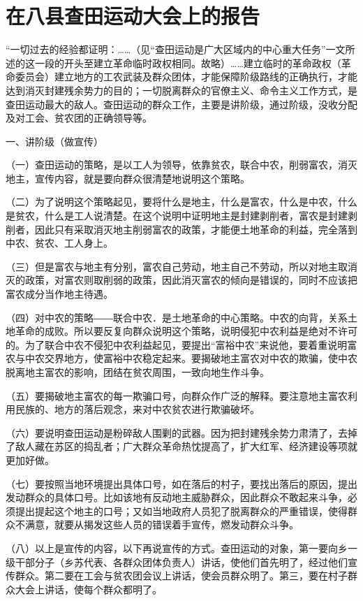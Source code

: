 \section[在八县查田运动大会上的报告（一九三三年六月十四日）]{在八县查田运动大会上的报告}


“一切过去的经验都证明：……（见“查田运动是广大区域内的中心重大任务”一文所述的这一段的开头至建立革命临时政权相同。故略）……建立临时的革命政权（革命委员会）建立地方的工农武装及群众团体，才能保障阶级路线的正确执行，才能达到消灭封建残余势力的目的；一切脱离群众的官僚主义、命令主义工作方式，是查田运动最大的敌人。查田运动的群众工作，主要是讲阶级，通过阶级，没收分配及对工会、贫农团的正确领导等。

一、讲阶级（做宣传）

（一）查田运动的策略，是以工人为领导，依靠贫农，联合中农，削弱富农，消灭地主，宣传内容，就是要向群众很清楚地说明这个策略。

（二）为了说明这个策略起见，要将什么是地主，什么是富农，什么是中农，什么是贫农，什么是工人说清楚。在这个说明中证明地主是封建剥削者，富农是封建剥削者，因此只有采取消灭地主削弱富农的政策，才能便土地革命的利益，完全落到中农、贫农、工人身上。

（三）但是富农与地主有分别，富农自己劳动，地主自己不劳动，所以对地主取消灭的政策，对富农则取削弱的政策，因此消灭富农的倾向是错误的，同时不应该把富农成分当作地主待遇。

（四）对中农的策略――联合中农．是土地革命的中心策略。中农的向背，关系土地革命的成败。所以要反复向群众说明这个策略，说明侵犯中农利益是绝对不许可的。为了联合中农不侵犯中农利益起见，要提出“富裕中农”来说他，要着重说明富农与中农交界地方，使富裕中农稳定起来。要揭破地主富农对中农的欺骗，使中农脱离地主富农的影响，团结在贫农周围，一致向地生作斗争。

（五）要揭破地主富农的每一欺骗口号，向群众作广泛的解释。要注意地主富农利用民族的、地方的落后观念，来对中农贫农进行欺骗破坏。

（六）要说明查田运动是粉碎敌人围剿的武器。因为把封建残余势力肃清了，去掉了敌人藏在苏区的捣乱者；广大群众革命热忱提高了，扩大红军、经济建设等项就更加好做。

（七）要按照当地环境提出具体口号，如在落后的村子，要找出落后的原因，提出发动群众的具体口号。比如该地有反动地主威胁群众，因此群众不敢起来斗争，必须提出提起这个地主的口号；又如当地政府人员犯了脱离群众的严重错误，使得群众不满意，就要从揭发这些人员的错误着手宣传，燃发动群众斗争。

（八）以上是宣传的内容，以下再说宣传的方式。查田运动的对象，第一要向乡一级干部分子（乡苏代表、各群众团体负责人）讲话，使他们首先明了，经过他们宣传群众。第二要在工会与贫农团会议上讲话，使会员群众明了。第三，要在村子群众大会上讲话，使每个群众都明了。

